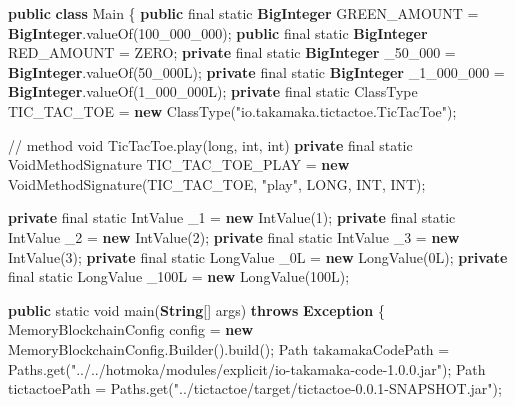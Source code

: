 \documentclass[a4paper,]{book}
\newenvironment{Shaded}{\begin{snugshade}}{\end{snugshade}}
\newcommand{\BuiltInTok}[1]{\textcolor[rgb]{0.39,0.29,0.61}{\textbf{#1}}}
\newcommand{\CommentTok}[1]{\textcolor[rgb]{0.54,0.53,0.53}{#1}}
\newcommand{\DataTypeTok}[1]{\textcolor[rgb]{0.00,0.34,0.68}{#1}}
\newcommand{\DecValTok}[1]{\textcolor[rgb]{0.69,0.50,0.00}{#1}}
\newcommand{\FunctionTok}[1]{\textcolor[rgb]{0.39,0.29,0.61}{#1}}
\newcommand{\KeywordTok}[1]{\textcolor[rgb]{0.12,0.11,0.11}{\textbf{#1}}}
\newcommand{\NormalTok}[1]{\textcolor[rgb]{0.12,0.11,0.11}{#1}}
\newcommand{\StringTok}[1]{\textcolor[rgb]{0.75,0.01,0.01}{#1}}
\renewenvironment{Shaded}{\begin{snugshade}\small}{\end{snugshade}}
\begin{document}
{\begin{Shaded}
\begin{Highlighting}[]
\KeywordTok{public} \KeywordTok{class}\NormalTok{ Main \{}
  \KeywordTok{public} \DataTypeTok{final} \DataTypeTok{static} \BuiltInTok{BigInteger}\NormalTok{ GREEN_AMOUNT = }\BuiltInTok{BigInteger}\NormalTok{.}\FunctionTok{valueOf}\NormalTok{(}\DecValTok{100_000_000}\NormalTok{);}
  \KeywordTok{public} \DataTypeTok{final} \DataTypeTok{static} \BuiltInTok{BigInteger}\NormalTok{ RED_AMOUNT = ZERO;}
  \KeywordTok{private} \DataTypeTok{final} \DataTypeTok{static} \BuiltInTok{BigInteger}\NormalTok{ _}\DecValTok{50_000}\NormalTok{ = }\BuiltInTok{BigInteger}\NormalTok{.}\FunctionTok{valueOf}\NormalTok{(}\DecValTok{50_000L}\NormalTok{);}
  \KeywordTok{private} \DataTypeTok{final} \DataTypeTok{static} \BuiltInTok{BigInteger}\NormalTok{ _}\DecValTok{1_000_000}\NormalTok{ = }\BuiltInTok{BigInteger}\NormalTok{.}\FunctionTok{valueOf}\NormalTok{(}\DecValTok{1_000_000L}\NormalTok{);}
  \KeywordTok{private} \DataTypeTok{final} \DataTypeTok{static}\NormalTok{ ClassType TIC_TAC_TOE}
\NormalTok{    = }\KeywordTok{new} \FunctionTok{ClassType}\NormalTok{(}\StringTok{"io.takamaka.tictactoe.TicTacToe"}\NormalTok{);}

  \CommentTok{// method void TicTacToe.play(long, int, int)}
  \KeywordTok{private} \DataTypeTok{final} \DataTypeTok{static}\NormalTok{ VoidMethodSignature TIC_TAC_TOE_PLAY}
\NormalTok{    = }\KeywordTok{new} \FunctionTok{VoidMethodSignature}\NormalTok{(TIC_TAC_TOE, }\StringTok{"play"}\NormalTok{, LONG, INT, INT);}

  \KeywordTok{private} \DataTypeTok{final} \DataTypeTok{static}\NormalTok{ IntValue _}\DecValTok{1}\NormalTok{ = }\KeywordTok{new} \FunctionTok{IntValue}\NormalTok{(}\DecValTok{1}\NormalTok{);}
  \KeywordTok{private} \DataTypeTok{final} \DataTypeTok{static}\NormalTok{ IntValue _}\DecValTok{2}\NormalTok{ = }\KeywordTok{new} \FunctionTok{IntValue}\NormalTok{(}\DecValTok{2}\NormalTok{);}
  \KeywordTok{private} \DataTypeTok{final} \DataTypeTok{static}\NormalTok{ IntValue _}\DecValTok{3}\NormalTok{ = }\KeywordTok{new} \FunctionTok{IntValue}\NormalTok{(}\DecValTok{3}\NormalTok{);}
  \KeywordTok{private} \DataTypeTok{final} \DataTypeTok{static}\NormalTok{ LongValue _}\DecValTok{0L}\NormalTok{ = }\KeywordTok{new} \FunctionTok{LongValue}\NormalTok{(}\DecValTok{0L}\NormalTok{);}
  \KeywordTok{private} \DataTypeTok{final} \DataTypeTok{static}\NormalTok{ LongValue _}\DecValTok{100L}\NormalTok{ = }\KeywordTok{new} \FunctionTok{LongValue}\NormalTok{(}\DecValTok{100L}\NormalTok{);}

  \KeywordTok{public} \DataTypeTok{static} \DataTypeTok{void} \FunctionTok{main}\NormalTok{(}\BuiltInTok{String}\NormalTok{[] args) }\KeywordTok{throws} \BuiltInTok{Exception}\NormalTok{ \{}
\NormalTok{    MemoryBlockchainConfig config = }\KeywordTok{new}\NormalTok{ MemoryBlockchainConfig.}\FunctionTok{Builder}\NormalTok{().}\FunctionTok{build}\NormalTok{();}
\NormalTok{    Path takamakaCodePath = Paths.}\FunctionTok{get}\NormalTok{(}\StringTok{"../../hotmoka/modules/explicit/io-takamaka-code-1.0.0.jar"}\NormalTok{);}
\NormalTok{    Path tictactoePath = Paths.}\FunctionTok{get}\NormalTok{(}\StringTok{"../tictactoe/target/tictactoe-0.0.1-SNAPSHOT.jar"}\NormalTok{);}


\end{Highlighting}
\end{Shaded}}
\end{document}
